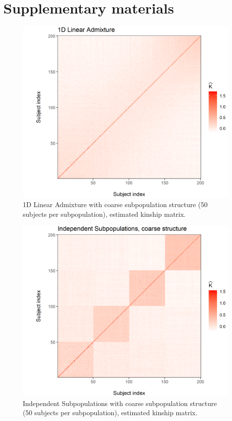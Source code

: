 \section{Supplementary materials}

\begin{figure}[H]
    \centering
    \includegraphics[scale = 1]{figures/admixed_kinship.png}
    \caption{1D Linear Admixture with coarse subpopulation structure (50 subjects per subpopulation), estimated kinship matrix.}
    \label{fig:admixed}
\end{figure}

\begin{figure}[H]
    \centering
    \includegraphics[scale = 1]{figures/indep_coarse_kinship.png}
    \caption{Independent Subpopulations with coarse subpopulation structure (50 subjects per subpopulation), estimated kinship matrix.}
    \label{fig:indep_coarse}
\end{figure}

